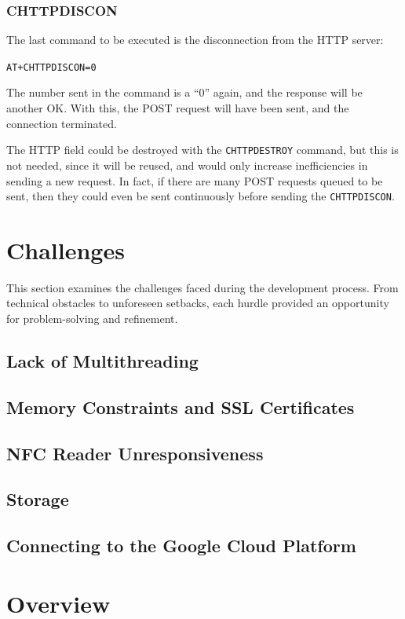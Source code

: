\subsubsection*{CHTTPDISCON}
The last command to be executed is the disconnection from the HTTP server:
\begin{center}
	\texttt{AT+CHTTPDISCON=0}
\end{center}

The number sent in the command is a ``0'' again, and the response will be another OK. With this, 
the POST request will have been sent, and the connection terminated.

The HTTP field could be destroyed with the \texttt{CHTTPDESTROY} command, but this is not needed, 
since it will be reused, and would only increase inefficiencies in sending a new request. In fact, 
if there are many POST requests queued to be sent, then they could even be sent continuously before 
sending the \texttt{CHTTPDISCON}.

\section{Challenges}

This section examines the challenges faced during the development process. From technical obstacles 
to unforeseen setbacks, each hurdle provided an opportunity for problem-solving and refinement.

\subsection{Lack of Multithreading}

\subsection{Memory Constraints and SSL Certificates}

\subsection{NFC Reader Unresponsiveness}

\subsection{Storage}

\subsection{Connecting to the Google Cloud Platform}


\section{Overview}
